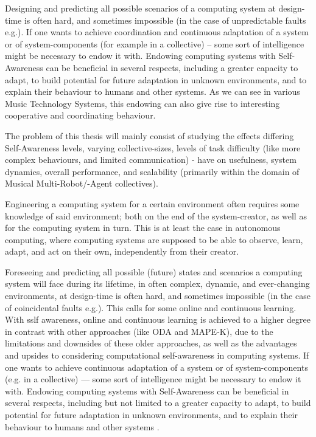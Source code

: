 Designing and predicting all possible scenarios of a computing system at design-time is often hard, and sometimes impossible (in the case of unpredictable faults e.g.). If one wants to achieve coordination and continuous adaptation of a system or of system-components (for example in a collective) -- some sort of intelligence might be necessary to endow it with. Endowing computing systems with Self-Awareness can be beneficial in several respects, including a greater capacity to adapt, to build potential for future adaptation in unknown environments, and to explain their behaviour to humans and other systems. As we can see in various Music Technology Systems, this endowing can also give rise to interesting cooperative and coordinating behaviour.

The problem of this thesis will mainly consist of studying the effects differing Self-Awareness levels, varying collective-sizes, levels of task difficulty (like more complex behaviours, and limited communication) - have on usefulness, system dynamics, overall performance, and scalability (primarily within the domain of Musical Multi-Robot/-Agent collectives).

Engineering a computing system for a certain environment often requires some knowledge of said environment; both on the end of the system-creator, as well as for the computing system in turn. This is at least the case in autonomous computing, where computing systems are supposed to be able to observe, learn, adapt, and act on their own, independently from their creator.

Foreseeing and predicting all possible (future) states and scenarios a computing system will face during its lifetime, in often complex, dynamic, and ever-changing environments, at design-time is often hard, and sometimes impossible (in the case of coincidental faults e.g.). This calls for some online and continuous learning. With sslf awareness, online and continuous learning is achieved to a higher degree in contrast with other approaches (like ODA and MAPE-K), due to the limitations and downsides of these older approaches, as well as the advantages and upsides to considering computational self-awareness in computing systems. If one wants to achieve continuous adaptation of a system or of system-components (e.g. in a collective) — some sort of intelligence might be necessary to endow it with. Endowing computing systems with Self-Awareness can be beneficial in several respects, including but not limited to a greater capacity to adapt, to build potential for future adaptation in unknown environments, and to explain their behaviour to humans and other systems \cite{sacs17_ch3}.

